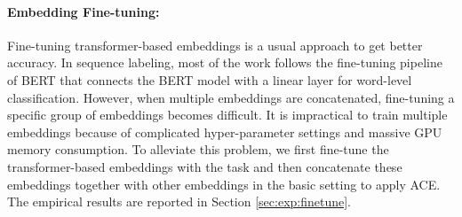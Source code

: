 \documentclass{article} \usepackage{iclr2021_conference,times}
\begin{document}
\paragraph{Embedding Fine-tuning:} Fine-tuning transformer-based embeddings is a usual approach to get better accuracy. In sequence labeling, most of the work follows the fine-tuning pipeline of BERT that connects the BERT model with a linear layer for word-level classification. 
However, when multiple embeddings are concatenated, fine-tuning a specific group of embeddings becomes difficult. 
It is impractical to train multiple embeddings because of complicated hyper-parameter settings and massive GPU memory consumption. 
To alleviate this problem, we first fine-tune the transformer-based embeddings with the task and then concatenate these embeddings together with other embeddings in the basic setting to apply ACE. The empirical results are reported in Section \ref{sec:exp:finetune}.
\end{document}
